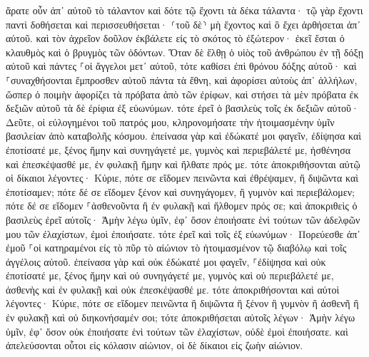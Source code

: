 \documentclass[twoside, 9pt]{extreport}
\begin{document}
ἄρατε οὖν ἀπ᾽ αὐτοῦ τὸ τάλαντον καὶ δότε τῷ ἔχοντι τὰ δέκα τάλαντα· 
τῷ γὰρ ἔχοντι παντὶ δοθήσεται καὶ περισσευθήσεται· ⸂τοῦ δὲ⸃ μὴ ἔχοντος καὶ ὃ ἔχει ἀρθήσεται ἀπ᾽ αὐτοῦ. 
καὶ τὸν ἀχρεῖον δοῦλον ἐκβάλετε εἰς τὸ σκότος τὸ ἐξώτερον· ἐκεῖ ἔσται ὁ κλαυθμὸς καὶ ὁ βρυγμὸς τῶν ὀδόντων. 
Ὅταν δὲ ἔλθῃ ὁ υἱὸς τοῦ ἀνθρώπου ἐν τῇ δόξῃ αὐτοῦ καὶ πάντες ⸀οἱ ἄγγελοι μετ᾽ αὐτοῦ, τότε καθίσει ἐπὶ θρόνου δόξης αὐτοῦ· 
καὶ ⸀συναχθήσονται ἔμπροσθεν αὐτοῦ πάντα τὰ ἔθνη, καὶ ἀφορίσει αὐτοὺς ἀπ᾽ ἀλλήλων, ὥσπερ ὁ ποιμὴν ἀφορίζει τὰ πρόβατα ἀπὸ τῶν ἐρίφων, 
καὶ στήσει τὰ μὲν πρόβατα ἐκ δεξιῶν αὐτοῦ τὰ δὲ ἐρίφια ἐξ εὐωνύμων. 
τότε ἐρεῖ ὁ βασιλεὺς τοῖς ἐκ δεξιῶν αὐτοῦ· Δεῦτε, οἱ εὐλογημένοι τοῦ πατρός μου, κληρονομήσατε τὴν ἡτοιμασμένην ὑμῖν βασιλείαν ἀπὸ καταβολῆς κόσμου. 
ἐπείνασα γὰρ καὶ ἐδώκατέ μοι φαγεῖν, ἐδίψησα καὶ ἐποτίσατέ με, ξένος ἤμην καὶ συνηγάγετέ με, 
γυμνὸς καὶ περιεβάλετέ με, ἠσθένησα καὶ ἐπεσκέψασθέ με, ἐν φυλακῇ ἤμην καὶ ἤλθατε πρός με. 
τότε ἀποκριθήσονται αὐτῷ οἱ δίκαιοι λέγοντες· Κύριε, πότε σε εἴδομεν πεινῶντα καὶ ἐθρέψαμεν, ἢ διψῶντα καὶ ἐποτίσαμεν; 
πότε δέ σε εἴδομεν ξένον καὶ συνηγάγομεν, ἢ γυμνὸν καὶ περιεβάλομεν; 
πότε δέ σε εἴδομεν ⸀ἀσθενοῦντα ἢ ἐν φυλακῇ καὶ ἤλθομεν πρός σε; 
καὶ ἀποκριθεὶς ὁ βασιλεὺς ἐρεῖ αὐτοῖς· Ἀμὴν λέγω ὑμῖν, ἐφ᾽ ὅσον ἐποιήσατε ἑνὶ τούτων τῶν ἀδελφῶν μου τῶν ἐλαχίστων, ἐμοὶ ἐποιήσατε. 
τότε ἐρεῖ καὶ τοῖς ἐξ εὐωνύμων· Πορεύεσθε ἀπ᾽ ἐμοῦ ⸀οἱ κατηραμένοι εἰς τὸ πῦρ τὸ αἰώνιον τὸ ἡτοιμασμένον τῷ διαβόλῳ καὶ τοῖς ἀγγέλοις αὐτοῦ. 
ἐπείνασα γὰρ καὶ οὐκ ἐδώκατέ μοι φαγεῖν, ⸀ἐδίψησα καὶ οὐκ ἐποτίσατέ με, 
ξένος ἤμην καὶ οὐ συνηγάγετέ με, γυμνὸς καὶ οὐ περιεβάλετέ με, ἀσθενὴς καὶ ἐν φυλακῇ καὶ οὐκ ἐπεσκέψασθέ με. 
τότε ἀποκριθήσονται καὶ αὐτοὶ λέγοντες· Κύριε, πότε σε εἴδομεν πεινῶντα ἢ διψῶντα ἢ ξένον ἢ γυμνὸν ἢ ἀσθενῆ ἢ ἐν φυλακῇ καὶ οὐ διηκονήσαμέν σοι; 
τότε ἀποκριθήσεται αὐτοῖς λέγων· Ἀμὴν λέγω ὑμῖν, ἐφ᾽ ὅσον οὐκ ἐποιήσατε ἑνὶ τούτων τῶν ἐλαχίστων, οὐδὲ ἐμοὶ ἐποιήσατε. 
καὶ ἀπελεύσονται οὗτοι εἰς κόλασιν αἰώνιον, οἱ δὲ δίκαιοι εἰς ζωὴν αἰώνιον. 
\end{document}
